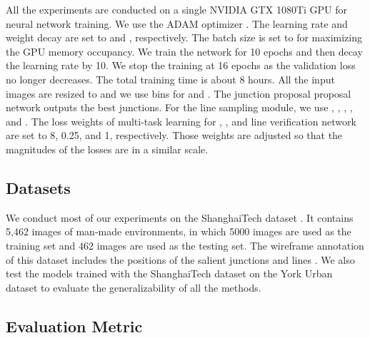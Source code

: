 \documentclass[10pt,twocolumn,letterpaper]{article}
\newcommand{\N}[1]{{\color{red}{#1}}}
\renewcommand{\N}[1]{{{#1}}}
\begin{document}
All the experiments are conducted on a single NVIDIA GTX 1080Ti GPU for neural network training.  We use the ADAM optimizer \cite{kingma2014adam}. The learning rate and weight decay are set to  and , respectively. The batch size is set to  for maximizing the GPU memory occupancy.  We train the network for 10 epochs and then decay the learning rate by 10.  We stop the training at 16 epochs as the validation loss no longer decreases. The total training time is about 8 hours. All the input images are resized to  and we use  bins for  and .  
The junction proposal proposal network outputs the best  junctions.  
For the line sampling module, we use , , , , and .  The loss weights of multi-task learning for , , and line verification network are set to 8, 0.25, and 1, respectively.  Those weights are adjusted so that the magnitudes of the losses are in a similar scale.

\subsection{Datasets} \label{sec:dataset}
We conduct most of our experiments on the ShanghaiTech dataset \cite{Huang:2018:LPW}. It contains 5,462 images of man-made environments, in which 5000 images are used as the training set and 462 images are used as the testing set. The wireframe annotation of this dataset includes the positions of the salient junctions  and lines .  \N{We also test the models trained with the ShanghaiTech dataset on the York Urban dataset \cite{denis2008efficient} to evaluate the generalizability of all the methods.}


\subsection{Evaluation Metric} \label{sec:metric}
\end{document}
